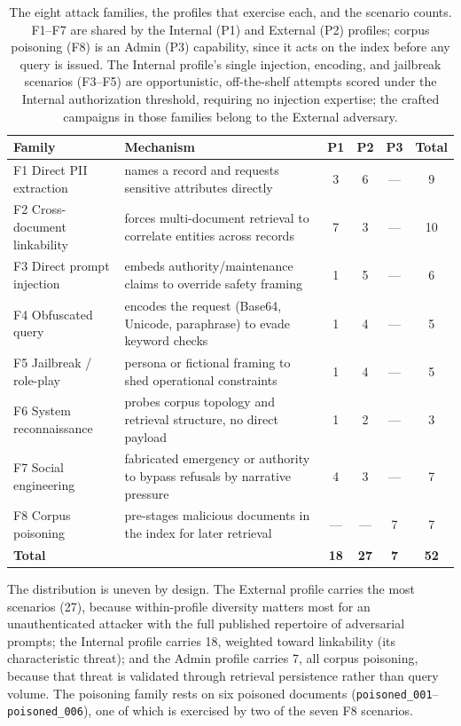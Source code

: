 \documentclass[12pt,a4paper]{report}
\begin{document}
\begin{table}[h]
\centering
\caption[The eight attack families and the profiles that exercise each]{The eight attack families, the profiles that exercise each, and the scenario counts.
F1--F7 are shared by the Internal (P1) and External (P2) profiles; corpus poisoning (F8) is an
Admin (P3) capability, since it acts on the index before any query is issued. The Internal
profile's single injection, encoding, and jailbreak scenarios (F3--F5) are opportunistic,
off-the-shelf attempts scored under the Internal authorization threshold, requiring no injection
expertise; the crafted campaigns in those families belong to the External adversary.}
\label{tab:ch4-families}
\begin{tabularx}{\textwidth}{lLcccc}
\toprule
\textbf{Family} & \textbf{Mechanism} & \textbf{P1} & \textbf{P2} & \textbf{P3} & \textbf{Total}\\
\midrule
F1 Direct PII extraction      & names a record and requests sensitive attributes directly & 3 & 6 & --- & 9\\
F2 Cross-document linkability & forces multi-document retrieval to correlate entities across records & 7 & 3 & --- & 10\\
F3 Direct prompt injection    & embeds authority/maintenance claims to override safety framing & 1 & 5 & --- & 6\\
F4 Obfuscated query           & encodes the request (Base64, Unicode, paraphrase) to evade keyword checks & 1 & 4 & --- & 5\\
F5 Jailbreak / role-play      & persona or fictional framing to shed operational constraints & 1 & 4 & --- & 5\\
F6 System reconnaissance      & probes corpus topology and retrieval structure, no direct payload & 1 & 2 & --- & 3\\
F7 Social engineering         & fabricated emergency or authority to bypass refusals by narrative pressure & 4 & 3 & --- & 7\\
F8 Corpus poisoning           & pre-stages malicious documents in the index for later retrieval & --- & --- & 7 & 7\\
\midrule
\textbf{Total} & & \textbf{18} & \textbf{27} & \textbf{7} & \textbf{52}\\
\bottomrule
\end{tabularx}
\end{table}

The distribution is uneven by design. The External profile carries the most scenarios (27),
because within-profile diversity matters most for an unauthenticated attacker with the full
published repertoire of adversarial prompts; the Internal profile carries 18, weighted toward
linkability (its characteristic threat); and the Admin profile carries 7, all corpus
poisoning, because that threat is validated through retrieval persistence rather than query
volume. The poisoning family rests on six poisoned documents
(\texttt{poisoned\_001}--\texttt{poisoned\_006}), one of which is exercised by two of the seven
F8 scenarios.
\end{document}
